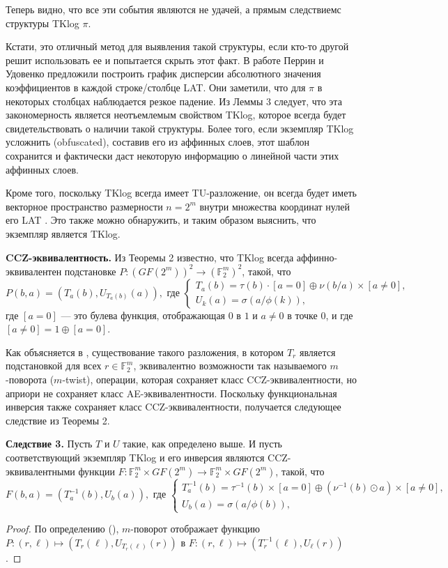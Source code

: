 Теперь видно, что все эти события являются не удачей, а прямым следствиемс структуры TKlog \(\pi\).

Кстати, это отличный метод для выявления такой структуры, если кто-то другой решит использовать ее и попытается скрыть этот факт. В работе \cite{PU16} Перрин и Удовенко предложили построить график дисперсии абсолютного значения коэффициентов в каждой строке/столбце LAT. Они заметили, что для \(\pi\) в некоторых столбцах наблюдается резкое падение. Из Леммы 3 следует, что эта закономерность является неотъемлемым свойством TKlog, которое всегда будет свидетельствовать о наличии такой структуры. Более того, если экземпляр TKlog усложнить (obfuscated), составив его из аффинных слоев, этот шаблон сохранится и фактически даст некоторую информацию о линейной части этих аффинных слоев.

Кроме того, поскольку TKlog всегда имеет TU-разложение, он всегда будет иметь векторное пространство размерности \(n = 2^m\)  внутри множества координат нулей его LAT \cite{CP19}. Это также можно обнаружить, и таким образом выяснить, что экземпляр является TKlog.

\textbf{CCZ-эквивалентность.} Из Теоремы 2 известно, что TKlog всегда аффинно-эквивалентен подстановке \(P : (GF(2^m))^2 \to (\mathbb{F}_2^m)^2\), такой, что
\[
P(b, a) = \left(T_a(b), U_{T_a(b)}(a)\right), \text{ где }\left\{\begin{array}{l}
T_a(b) = \tau(b) \cdot [a = 0] \oplus \nu(b/a) \times [a \neq 0], \\
U_k(a) = \sigma(a/\phi(k)),
\end{array}\right.
\]
где \([a = 0]\) — это булева функция, отображающая \(0\) в \(1\) и \(a \neq 0\) в точке \(0\), и где \([a \neq 0] = 1 \oplus [a = 0]\).

Как объясняется в \cite{CP19}, существование такого разложения, в котором \(T_r\) является подстановкой для всех \(r \in \mathbb{F}_2^m\), эквивалентно возможности так называемого \(m\)-поворота (\(m\)-twist), операции, которая сохраняет класс CCZ-эквивалентности, но априори не сохраняет класс AE-эквивалентности. Поскольку функциональная инверсия также сохраняет класс CCZ-эквивалентности, получается следующее следствие из Теоремы 2.

\textbf{Следствие 3.}
Пусть \(T\) и \(U\) такие, как определено выше. И пусть соответствующий экземпляр TKlog и его инверсия являются CCZ-эквивалентными функции \(F : \mathbb{F}_2^m \times GF(2^m) \to \mathbb{F}_2^m \times GF(2^m)\), такой, что
\[
F(b, a) = \left(T_a^{-1}(b), U_b(a)\right), \text{ где }\left
\{\begin{array}{l}
T_a^{-1}(b) = \tau^{-1}(b) \times [a = 0] \oplus \left(\nu^{-1}(b) \odot a\right) \times [a \neq 0], \\
U_b(a) = \sigma(a/\phi(b)),
\end{array}\right.
\]
\begin{proof}
По определению (\cite{CP19}), \(m\)-поворот отображает функцию \(P : (r, \ell) \mapsto \left(T_r(\ell), U_{T_r(\ell)}(r)\right)\) в \(F : (r, \ell) \mapsto \left(T_r^{-1}(\ell), U_{\ell}(r)\right)\).
\end{proof}

